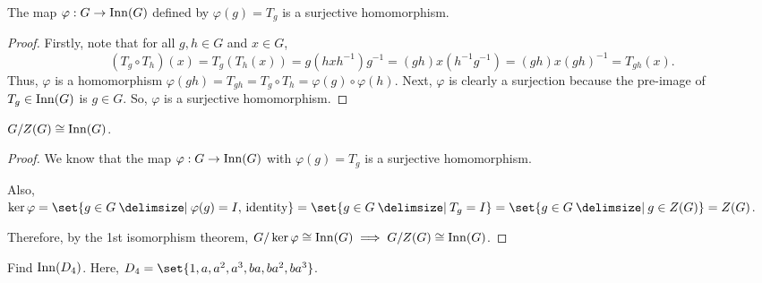 \documentclass[11pt]{penrose}
\begin{document}
\begin{nthm}
    The map $\varphi: G \to \operatorname{Inn}(G)$ defined by $\varphi(g) = T_{g}$ is a surjective homomorphism.
\end{nthm}
\begin{proof}
    Firstly, note that for all $g,h \in G$ and $x \in G$,
    \begin{equation*}
        (T_{g} \circ T_{h})(x)
        = T_{g} ( T_{h}(x) )
        = g ( hxh^{-1} ) g^{-1}
        = (gh) x (h^{-1}g^{-1})
        = (gh) x (gh)^{-1}
        = T_{gh} (x).
    \end{equation*}
    Thus, $\varphi$ is a homomorphism $\varphi(gh) = T_{gh} = T_{g} \circ T_{h} = \varphi(g) \circ \varphi(h)$. Next, $\varphi$ is clearly a surjection because the pre-image of $T_{g} \in \operatorname{Inn}(G)$ is $g \in G$. So, $\varphi$ is a surjective homomorphism.
\end{proof}

\begin{nthm}
    $G/Z(G) \mathrel{\cong} \operatorname{Inn}(G)$.
\end{nthm}
\begin{proof}
    We know that the map $\varphi : G \to \operatorname{Inn}(G)$ with $\varphi(g) = T_{g}$ is a surjective homomorphism.

    Also, $\ker\varphi = \set{g \in G \st \varphi(g) = I,\, \text{identity}} = \set{g \in G \st T_{g} = I} = \set{g \in G \st g \in Z(G)} = Z(G)$.

    Therefore, by the 1st isomorphism theorem, $G / \ker\varphi \mathrel{\cong} \operatorname{Inn}(G) \implies G / Z(G) \mathrel{\cong} \operatorname{Inn}(G)$.
\end{proof}

\begin{nex}
    Find $\operatorname{Inn}(D_{4})$. Here, $D_{4} = \set{1, a, a^{2}, a^{3}, ba, ba^{2}, ba^{3}}$.
\end{nex}
\end{document}
